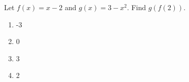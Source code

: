 \bigskip

\item  Let $f(x)=x-2$ and $g(x)=3-x^2$.  Find $g(f(2))$.

\begin{enumerate}
\item -3
\item 0
\item 3
\item 2
\end{enumerate}

